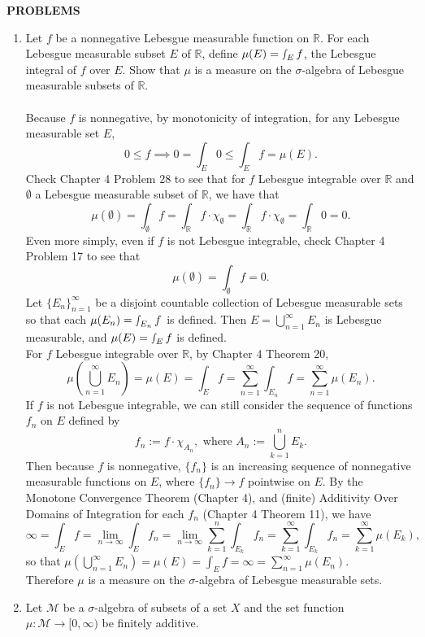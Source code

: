 \begin{center}
	\textbf{PROBLEMS}
\end{center}
\begin{enumerate}
	\setcounter{enumi}{0}
	\item Let $f$ be a nonnegative Lebesgue measurable function on $\mathbb{R}$. 
	For each Lebesgue measurable subset $E$ of $\mathbb{R}$, define $\mu(E) = \smallint_E f$, the Lebesgue integral of $f$ over $E$.
	Show that $\mu$ is a measure on the $\sigma$-algebra of Lebesgue measurable subsets of $\mathbb{R}$.\\
	\\Because $f$ is nonnegative, by monotonicity of integration, for any Lebesgue measurable set $E$, 
	\[
		0\le f\implies 0=\int_E 0\le \int_E f=\mu(E).
	\]
	Check Chapter 4 Problem 28 to see that for $f$ Lebesgue integrable over $\mathbb{R}$ and $\emptyset$ a Lebesgue measurable subset of $\mathbb{R}$, we have that
	\[
		\mu(\emptyset)=\int_\emptyset f=\int_\mathbb{R} f\cdot\chi_\emptyset=\int_\mathbb{R} f\cdot\chi_\emptyset=\int_\mathbb{R} 0 = 0.
	\]
	Even more simply, even if $f$ is not Lebesgue integrable, check Chapter 4 Problem 17 to see that
	\[
		\mu(\emptyset)=\int_\emptyset f=0.
	\]
	Let $\{E_n\}_{n=1}^\infty$ be a disjoint countable collection of Lebesgue measurable sets so that each $\mu(E_n) = \smallint_{E_n} f$ is defined.
	Then $E=\bigcup_{n=1}^\infty E_n$ is Lebesgue measurable, and $\mu(E) = \smallint_E f$ is defined.
	\\For $f$ Lebesgue integrable over $\mathbb{R}$, by Chapter 4 Theorem 20,
	\[
		\mu(\bigcup_{n=1}^\infty E_n)=\mu(E)=\int_E f =\sum_{n=1}^\infty\int_{E_n}f=\sum_{n=1}^\infty\mu(E_n).
	\]
	If $f$ is not Lebesgue integrable, we can still consider the sequence of functions $f_n$ on $E$ defined by
	\[
		f_n:=f\cdot\chi_{A_n},\text{ where }A_n:=\bigcup_{k=1}^nE_k.
	\]
	Then because $f$ is nonnegative, $\{f_n\}$ is an increasing sequence of nonnegative measurable functions on $E$, where $\{f_n\}\to f$ pointwise on $E$.
	By the Monotone Convergence Theorem (Chapter 4), and (finite) Additivity Over Domains of Integration for each $f_n$ (Chapter 4 Theorem 11), we have
	\[
		\infty=\int_E f=\lim_{n\to\infty}\int_Ef_n=\lim_{n\to\infty}\sum_{k=1}^n\int_{E_k}f_n=\sum_{k=1}^\infty\int_{E_k}f_n=\sum_{k=1}^\infty\mu(E_k),
	\] 
	so that $\mu(\bigcup_{n=1}^\infty E_n)=\mu(E)=\int_E f =\infty=\sum_{n=1}^\infty\mu(E_n)$.
	\\Therefore $\mu$ is a measure on the $\sigma$-algebra of Lebesgue measurable sets. 
	\item Let $\mathcal{M}$ be a $\sigma$-algebra of subsets of a set $X$ and the set function $\mu : \mathcal{M} \to [0,\infty)$ be finitely additive.

\end{enumerate}
